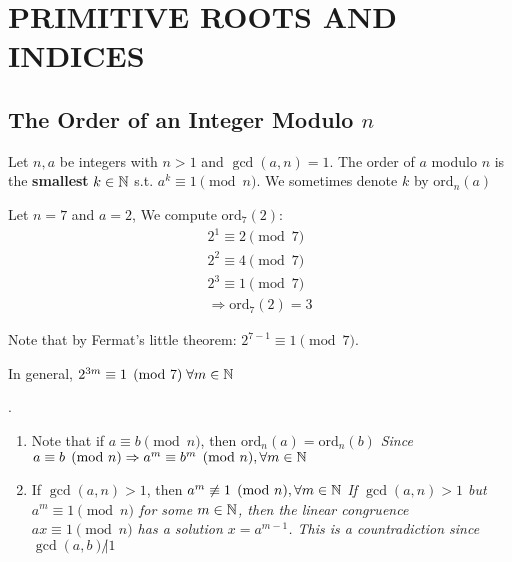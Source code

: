 \chapter{PRIMITIVE ROOTS AND INDICES}

\section{The Order of an Integer Modulo $n$}

\setcounter{definition}{0}
\setcounter{theorem}{0}

\begin{definition}
    Let $n, a$ be integers with $n>1$ and $\gcd(a, n) = 1$.
    The order of $a$ modulo $n$ is the \textbf{smallest} $k \in \mathbb{N}$ s.t. $a^k \equiv 1 \pmod n$.
    We sometimes denote $k$ by $\text{ord}_n(a)$
\end{definition}
\begin{eg}
    Let $n = 7$ and $a = 2$, We compute $\text{ord}_7(2)$:
    \[
        \begin{aligned}
            2^1 \equiv 2 \pmod 7 \\
            2^2 \equiv 4 \pmod 7 \\
            2^3 \equiv 1 \pmod 7 \\
            \Rightarrow \text{ord}_7(2) = 3
        \end{aligned}
    \]

    Note that by Fermat's little theorem: $2^{7-1} \equiv 1 \pmod 7$.

    In general, $2^{3m} \equiv 1 \pmod 7 \; \forall m \in \mathbb{N}$
\end{eg}
\begin{remark}
    .
    \begin{enumerate}
        \item Note that if $a \equiv b \pmod n$, then $\text{ord}_n(a) = \text{ord}_n(b)$\newline
        \emph{Since $a \equiv b \pmod n \Rightarrow a^m \equiv b^m \pmod n , \forall m \in \mathbb{N}$}

        \item If $\gcd(a, n) > 1$, then $a^m \not\equiv 1 \pmod n, \forall m \in \mathbb{N}$\newline
        \emph{If $\gcd(a, n) > 1$ but $a^m \equiv 1 \pmod n$ for some $m \in \mathbb{N}$, then
        the linear congruence $ax \equiv 1 \pmod n$ has a solution $x = a^{m-1}$. This is a countradiction
        since $\gcd(a, b) \not | 1$}
    \end{enumerate}
\end{remark}

